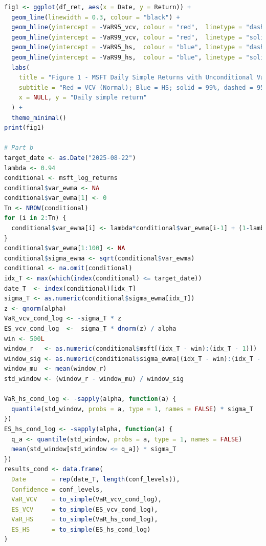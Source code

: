 \documentclass[11pt]{article}
\begin{document}
\begin{lstlisting}[language=R, caption={R code for VaR and ES estimation}]
fig1 <- ggplot(df_ret, aes(x = Date, y = Return)) +
  geom_line(linewidth = 0.3, colour = "black") +
  geom_hline(yintercept = -VaR95_vcv, colour = "red",  linetype = "dashed") +
  geom_hline(yintercept = -VaR99_vcv, colour = "red",  linetype = "solid") +
  geom_hline(yintercept = -VaR95_hs,  colour = "blue", linetype = "dashed") +
  geom_hline(yintercept = -VaR99_hs,  colour = "blue", linetype = "solid") +
  labs(
    title = "Figure 1 - MSFT Daily Simple Returns with Unconditional VaR Lines",
    subtitle = "Red = VCV (Normal); Blue = HS; solid = 99%, dashed = 95%",
    x = NULL, y = "Daily simple return"
  ) +
  theme_minimal()
print(fig1)

# Part b
target_date <- as.Date("2025-08-22")
lambda <- 0.94
conditional <- msft_log_returns
conditional$var_ewma <- NA
conditional$var_ewma[1] <- 0
Tn <- NROW(conditional)
for (i in 2:Tn) {
  conditional$var_ewma[i] <- lambda*conditional$var_ewma[i-1] + (1-lambda)*conditional$msft[i-1]^2
}
conditional$var_ewma[1:100] <- NA
conditional$sigma_ewma <- sqrt(conditional$var_ewma)
conditional <- na.omit(conditional)
idx_T <- max(which(index(conditional) <= target_date))
date_T  <- index(conditional)[idx_T]
sigma_T <- as.numeric(conditional$sigma_ewma[idx_T])
z <- qnorm(alpha)
VaR_vcv_cond_log <- -sigma_T * z
ES_vcv_cond_log  <-  sigma_T * dnorm(z) / alpha
win <- 500L
window_r   <- as.numeric(conditional$msft[(idx_T - win):(idx_T - 1)])
window_sig <- as.numeric(conditional$sigma_ewma[(idx_T - win):(idx_T - 1)])
window_mu  <- mean(window_r)
std_window <- (window_r - window_mu) / window_sig

VaR_hs_cond_log <- -sapply(alpha, function(a) {
  quantile(std_window, probs = a, type = 1, names = FALSE) * sigma_T
})
ES_hs_cond_log <- -sapply(alpha, function(a) {
  q_a <- quantile(std_window, probs = a, type = 1, names = FALSE)
  mean(std_window[std_window <= q_a]) * sigma_T
})
results_cond <- data.frame(
  Date       = rep(date_T, length(conf_levels)),
  Confidence = conf_levels,
  VaR_VCV    = to_simple(VaR_vcv_cond_log),
  ES_VCV     = to_simple(ES_vcv_cond_log),
  VaR_HS     = to_simple(VaR_hs_cond_log),
  ES_HS      = to_simple(ES_hs_cond_log)
)
\end{lstlisting}
\end{document}
